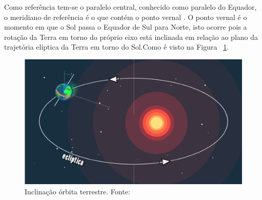 Como referência tem-se o paralelo central, conhecido como paralelo do Equador,  o meridiano de referência é o que contém o ponto vernal . O ponto vernal é o momento em que o Sol passa o Equador de Sul para Norte, isto ocorre pois a rotação da Terra em torno do próprio eixo está inclinada em relação ao plano da trajetória elíptica da Terra em torno do Sol.Como é visto na Figura  ~\ref{fig:inclinacao}.

\begin{figure}[H]
	\centering
	\includegraphics[width=.7\columnwidth]{images/inclinacao.jpg}
	\caption{Inclinação órbita terrestre. Fonte: ~\cite[]{Portal_do_Astronomo}}
	\label{fig:inclinacao}
\end{figure}

